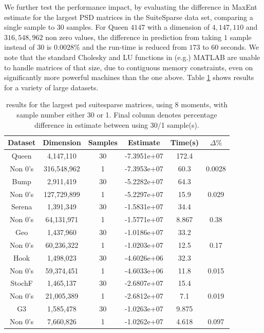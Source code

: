 \documentclass[journal]{IEEEtran}
\begin{document}
	We further test the performance impact, by evaluating the difference in MaxEnt estimate for the largest PSD matrices in the SuiteSparse data set, comparing a single sample to $30$ samples. For $\text{Queen}$ $ 4147$ with a dimension of $4,147,110$ and $316,548,962$ non zero values, the difference in prediction from taking $1$ sample instead of $30$ is $0.0028\%$ and the run-time is reduced from $173$ to $60$ seconds. We note that the standard Cholesky and LU functions in (e.g.) MATLAB are unable to handle matrices of that size, due to contiguous memory constraints, even on significantly more powerful machines than the one above. Table \ref{table:experiment 2} shows results for a variety of large datasets.
	\begin{table}[h!]
		\centering
		\begin{center}
			\begin{tabular}{||c c c c c c||} 
				\hline
				Dataset & Dimension & Samples & Estimate & Time(s)  & \textbf{$\Delta \%$} \\ [0.5ex] 
				\hline\hline
				Queen & 4,147,110 & 30 & -7.3951e+07 & 172.4 & \\
				Non 0's & 316,548,962 & 1 & -7.3953e+07 & 60.3 & 0.0028 \\ 
				\hline
				Bump & 2,911,419 & 30 & -5.2282e+07 & 64.3 &\\ 
				Non 0's & 127,729,899 & 1 & -5.2297e+07 & 15.9 & 0.029\\ 
				\hline
				Serena & 1,391,349 & 30 & -1.5831e+07 & 34.4 & \\ 
				Non 0's & 64,131,971 & 1 & -1.5771e+07 & 8.867 & 0.38\\ 
				\hline
				Geo & 1,437,960 & 30 & -1.0186e+07 & 33.2 &\\ 
				Non 0's & 60,236,322 & 1 & -1.0203e+07 & 12.5 & 0.17\\
				\hline
				Hook & 1,498,023 & 30 & -4.6026e+06 & 32.3 & \\  
				Non 0's & 59,374,451 & 1 & -4.6033e+06 & 11.8 & 0.015\\
				\hline
				StochF & 1,465,137 & 30 & -2.6807e+07 & 15.4 & \\ 
				Non 0's & 21,005,389 & 1 & -2.6812e+07 & 7.1 & 0.019\\
				\hline
				G3 & 1,585,478 & 30 & -1.0263e+07 & 9.875 & \\  
				Non 0's & 7,660,826 & 1 & -1.0262e+07 & 4.618 & 0.097 \\ [0.5ex] 
				\hline
			\end{tabular}
		\end{center}
		\caption{results for the largest psd suitesparse matrices, using 8 moments, with sample number either 30 or 1. Final column denotes percentage difference in estimate between using 30/1 sample(s).}
		\label{table:experiment 2}
	\end{table}
\end{document}
